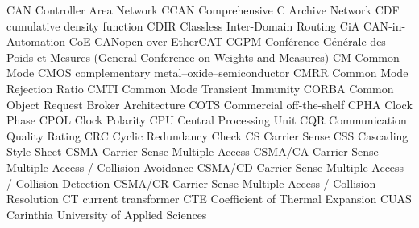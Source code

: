 		{CAN}		{Controller Area Network}
		{CCAN}		{Comprehensive C Archive Network}
		{CDF}		{cumulative density function}
		{CDIR}		{Classless Inter-Domain Routing}
		{CiA}		{{\acrshort{CAN}}-in-Automation}
		{CoE}		{CANopen over EtherCAT}
		{CGPM}		{Conférence Générale des Poids et Mesures (General Conference on Weights and Measures)}
			{CM}		{Common Mode}
		{CMOS}		{complementary metal–oxide–semiconductor}
		{CMRR}		{Common Mode Rejection Ratio}
		{CMTI}		{Common Mode Transient Immunity}
		{CORBA}		{Common Object Request Broker Architecture}
		{COTS}		{Commercial off-the-shelf}
		{CPHA}		{Clock Phase}
		{CPOL}		{Clock Polarity}
		{CPU}		{Central Processing Unit}
		{CQR}		{Communication Quality Rating}
		{CRC}		{Cyclic Redundancy Check}
			{CS}		{Carrier Sense}
		{CSS}		{Cascading Style Sheet}
		{CSMA}		{Carrier Sense Multiple Access}
	{CSMA/CA}	{Carrier Sense Multiple Access / Collision Avoidance}
	{CSMA/CD}	{Carrier Sense Multiple Access / Collision Detection}
	{CSMA/CR}	{Carrier Sense Multiple Access / Collision Resolution}
			{CT}		{current transformer}
		{CTE}		{Coefficient of Thermal Expansion}
		{CUAS}		{Carinthia University of Applied Sciences}

